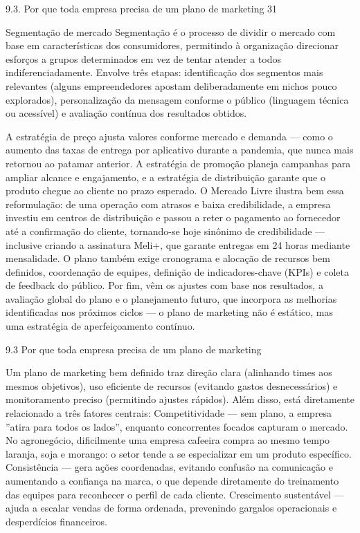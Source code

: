 9.3. Por que toda empresa precisa de um plano de marketing 31

Segmentação de mercado Segmentação é o processo de dividir o mercado com base em características dos consumidores, permitindo à organização direcionar esforços a grupos determinados em vez de tentar atender a todos indiferenciadamente. Envolve três etapas: identificação dos segmentos mais relevantes (alguns empreendedores apostam deliberadamente em nichos pouco explorados), personalização da mensagem conforme o público (linguagem técnica ou acessível) e avaliação contínua dos resultados obtidos.

A estratégia de preço ajusta valores conforme mercado e demanda — como o aumento das taxas de entrega por aplicativo durante a pandemia, que nunca mais retornou ao patamar anterior. A estratégia de promoção planeja campanhas para ampliar alcance e engajamento, e a estratégia de distribuição garante que o produto chegue ao cliente no prazo esperado. O Mercado Livre ilustra bem essa reformulação: de uma operação com atrasos e baixa credibilidade, a empresa investiu em centros de distribuição e passou a reter o pagamento ao fornecedor até a confirmação do cliente, tornando-se hoje sinônimo de credibilidade — inclusive criando a assinatura Meli+, que garante entregas em 24 horas mediante mensalidade. O plano também exige cronograma e alocação de recursos bem definidos, coordenação de equipes, definição de indicadores-chave (KPIs) e coleta de feedback do público. Por fim, vêm os ajustes com base nos resultados, a avaliação global do plano e o planejamento futuro, que incorpora as melhorias identificadas nos próximos ciclos — o plano de marketing não é estático, mas uma estratégia de aperfeiçoamento contínuo.

9.3 Por que toda empresa precisa de um plano de marketing

Um plano de marketing bem definido traz direção clara (alinhando times aos mesmos objetivos), uso eficiente de recursos (evitando gastos desnecessários) e monitoramento preciso (permitindo ajustes rápidos). Além disso, está diretamente relacionado a três fatores centrais: Competitividade — sem plano, a empresa ”atira para todos os lados”, enquanto concorrentes focados capturam o mercado. No agronegócio, dificilmente uma empresa cafeeira compra ao mesmo tempo laranja, soja e morango: o setor tende a se especializar em um produto específico. Consistência — gera ações coordenadas, evitando confusão na comunicação e aumentando a confiança na marca, o que depende diretamente do treinamento das equipes para reconhecer o perfil de cada cliente. Crescimento sustentável — ajuda a escalar vendas de forma ordenada, prevenindo gargalos operacionais e desperdícios financeiros.

